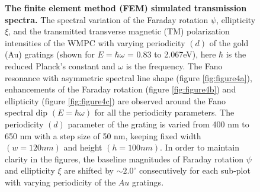 \documentclass[13pt]{article}
\begin{document}
\begin{figure}[hbt]
\begin{subfigure}[]{.49\linewidth}
		\caption{}
		\label{fig:figure4d}
	\end{subfigure}
	\caption{\textbf{The finite element method (FEM) simulated transmission spectra.} The spectral variation of the Faraday rotation $\psi$, ellipticity $\xi$, and the transmitted transverse magnetic (TM) polarization intensities of the WMPC with varying periodicity $(d)$ of the gold (Au) gratings (shown for $E=\hbar \omega$ = 0.83 to 2.067eV), here $\hbar$ is the reduced Planck’s constant and $\omega$ is the frequency. The Fano resonance with asymmetric spectral line shape (figure \ref{fig:figure4a}), enhancements of the Faraday rotation  (figure \ref{fig:figure4b}) and ellipticity (figure \ref{fig:figure4c}) are observed around the Fano spectral dip $(E=\hbar \omega)$ for all the periodicity parameters. The periodicity $(d)$ parameter of the grating is varied from 400 nm to 650 nm with a step size of 50 nm, keeping fixed width $(w = 120 nm)$ and height $(h = 100 nm)$. In order to maintain clarity in the figures, the baseline magnitudes of Faraday rotation $\psi$ and ellipticity $\xi$ are shifted by $ \sim 2.0^{\circ}$ consecutively for each sub-plot with varying periodicity of the $Au$ gratings.}
	\label{fig:figure4}
\end{figure}
\end{document}
